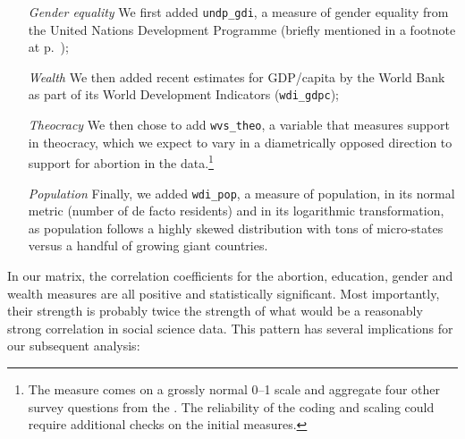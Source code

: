 \begin{enumerate}
	\item[\emph{Gender equality}] We first added \texttt{undp\_gdi}, a measure of gender equality from the United Nations Development Programme (briefly mentioned in a footnote at p.~\pageref{fn:gdi_gem});

	\item[\emph{Wealth}] We then added recent estimates for GDP/capita by the World Bank as part of its World Development Indicators (\texttt{wdi\_gdpc});

	\item[\emph{Theocracy}] We then chose to add \texttt{wvs\_theo}, a \WVS{} variable that measures support in theocracy, which we expect to vary in a diametrically opposed direction to support for abortion in the data.\footnote{The measure comes on a grossly normal 0--1 scale and aggregate four other survey questions from the \WVS{}. The reliability of the coding and scaling could require additional checks on the initial measures.}

	\item[\emph{Population}] Finally, we added \texttt{wdi\_pop}, a measure of population, in its normal metric (number of de facto residents) and in its logarithmic transformation, as population follows a highly skewed distribution with tons of micro-states versus a handful of growing giant countries.
\end{enumerate}

In our matrix, the correlation coefficients for the abortion, education, gender and wealth measures are all positive and statistically significant. Most importantly, their strength is probably twice the strength of what would be a reasonably strong correlation in social science data. This pattern has several implications for our subsequent analysis:

